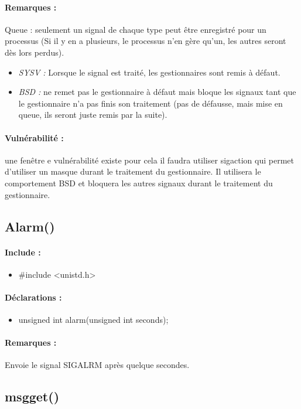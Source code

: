 \documentclass{article}[12pt]
\begin{document}
\paragraph{Remarques : }
Queue : seulement un signal de chaque type peut être enregistré pour un processus (Si il y en a plusieurs, le processus n'en gère qu'un, les autres seront dès lors perdus). 
\begin{itemize}
	\item \emph{SYSV : } Lorsque le signal est traité, les gestionnaires sont remis à défaut.
    \item  \emph{BSD : } ne remet pas le gestionnaire à défaut mais bloque les signaux tant que le gestionnaire n'a pas finis son traitement (pas de défausse, mais mise en queue, ils seront juste remis par la suite). 
\end{itemize}
\paragraph{Vulnérabilité : } une fenêtre e vulnérabilité existe pour cela il faudra utiliser sigaction qui permet d'utiliser un masque durant le traitement du gestionnaire. Il utilisera le comportement BSD et bloquera les autres signaux durant le traitement du gestionnaire.
\subsection{Alarm()}
\paragraph{Include : }
\begin{itemize}
	\item \#include <unistd.h>
\end{itemize}
\paragraph{Déclarations : }
\begin{itemize}
	\item unsigned int alarm(unsigned int seconds);
\end{itemize}
\paragraph{Remarques : }
Envoie le signal SIGALRM après quelque secondes.
\subsection{msgget()}
\end{document}
